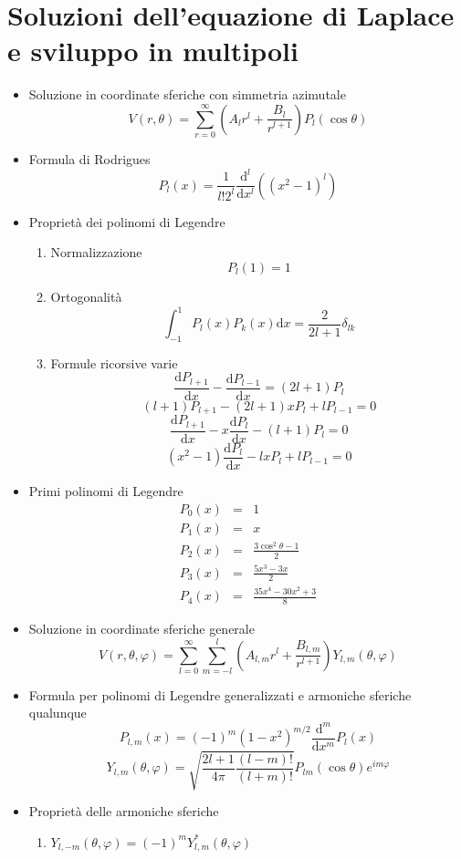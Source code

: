 \documentclass[a4paper,11pt]{book}
\newcommand{\dif}{\mathrm{d}}
\theoremstyle{theorem}
\theoremstyle{definition}
\begin{document}
\section{Soluzioni dell'equazione di Laplace e sviluppo in multipoli}
\begin{itemize}
	\item Soluzione in coordinate sferiche con simmetria azimutale
	\[V(r,\theta)=\sum_{r=0}^{\infty}\left(A_lr^l+\frac{B_l}{r^{l+1}}\right)P_l(\cos\theta)\]
	\item Formula di Rodrigues
	\[P_l(x)=\frac{1}{l!2^l}\frac{\dif^l}{\dif x^l}\left((x^2-1)^l\right)\]
	\item Proprietà dei polinomi di Legendre
	\begin{enumerate}
		\item Normalizzazione\[P_l(1)=1\]
		\item Ortogonalità
		\[\int_{-1}^{1}P_l(x)P_k(x)\dif x=\frac{2}{2l+1}\delta_{lk}\]
		\item Formule ricorsive varie
		\[\frac{\dif P_{l+1}}{\dif x}-\frac{\dif P_{l-1}}{\dif x}=(2l+1)P_l\]
		\[(l+1)P_{l+1}-(2l+1)xP_l+lP_{l-1}=0\]
		\[\frac{\dif P_{l+1}}{\dif x}-x\frac{\dif P_l}{\dif x}-(l+1)P_l=0\]
		\[(x^2-1)\frac{\dif P_{l}}{\dif x}-lxP_l+lP_{l-1}=0\]
	\end{enumerate}
	\item Primi polinomi di Legendre
	\begin{eqnarray}
		P_0(x)&=&1\nonumber\\
		P_1(x)&=&x\nonumber\\
		P_2(x)&=&\frac{3\cos^2\theta-1}{2}\nonumber\\
		P_3(x)&=&\frac{5x^3-3x}{2}\nonumber\\
		P_4(x)&=&\frac{35x^4-30x^2+3}{8}\nonumber
	\end{eqnarray}
	\item Soluzione in coordinate sferiche generale
	\[V(r,\theta,\varphi)=\sum_{l=0}^{\infty}\sum_{m=-l}^{l}\left(A_{l,m}r^l+\frac{B_{l,m}}{r^{l+1}}\right)Y_{l,m}(\theta,\varphi)\]
	\item Formula per polinomi di Legendre generalizzati e armoniche sferiche qualunque
	\[P_{l,m}(x)=(-1)^m(1-x^2)^{m/2}\frac{\dif^{m}}{\dif x^{m}}P_l(x)\]
	\[Y_{l,m}(\theta,\varphi)=\sqrt{\frac{2l+1}{4\pi}\frac{(l-m)!}{(l+m)!}}P_{lm}(\cos\theta)e^{im\varphi}\]
	\item Proprietà delle armoniche sferiche
	\begin{enumerate}
		\item $Y_{l,-m}(\theta,\varphi)=(-1)^mY^*_{l,m}(\theta,\varphi)$

\end{enumerate}
\end{itemize}
\end{document}
